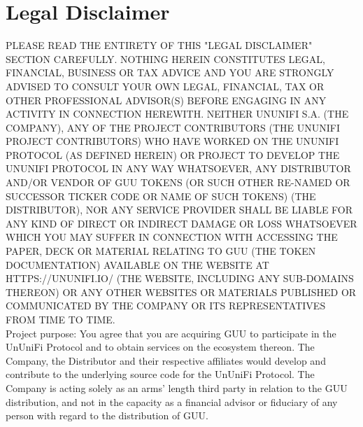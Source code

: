\documentclass[dvipdfmx]{jsarticle}
\begin{document}
\section{Legal Disclaimer}
PLEASE READ THE ENTIRETY OF THIS "LEGAL DISCLAIMER" SECTION CAREFULLY. NOTHING HEREIN CONSTITUTES LEGAL, FINANCIAL, BUSINESS OR TAX ADVICE AND YOU ARE STRONGLY ADVISED TO CONSULT YOUR OWN LEGAL, FINANCIAL, TAX OR OTHER PROFESSIONAL ADVISOR(S) BEFORE ENGAGING IN ANY ACTIVITY IN CONNECTION HEREWITH. NEITHER UNUNIFI S.A. (THE COMPANY), ANY OF THE PROJECT CONTRIBUTORS (THE UNUNIFI PROJECT CONTRIBUTORS) WHO HAVE WORKED ON THE UNUNIFI PROTOCOL (AS DEFINED HEREIN) OR PROJECT TO DEVELOP THE UNUNIFI PROTOCOL IN ANY WAY WHATSOEVER, ANY DISTRIBUTOR AND/OR VENDOR OF GUU TOKENS (OR SUCH OTHER RE-NAMED OR SUCCESSOR TICKER CODE OR NAME OF SUCH TOKENS) (THE DISTRIBUTOR), NOR ANY SERVICE PROVIDER SHALL BE LIABLE FOR ANY KIND OF DIRECT OR INDIRECT DAMAGE OR LOSS WHATSOEVER WHICH YOU MAY SUFFER IN CONNECTION WITH ACCESSING THE PAPER, DECK OR MATERIAL RELATING TO GUU (THE TOKEN DOCUMENTATION) AVAILABLE ON THE WEBSITE AT HTTPS://UNUNIFI.IO/ (THE WEBSITE, INCLUDING ANY SUB-DOMAINS THEREON) OR ANY OTHER WEBSITES OR MATERIALS PUBLISHED OR COMMUNICATED BY THE COMPANY OR ITS REPRESENTATIVES FROM TIME TO TIME.\\
Project purpose: You agree that you are acquiring GUU to participate in the UnUniFi Protocol and to obtain services on the ecosystem thereon. The Company, the Distributor and their respective affiliates would develop and contribute to the underlying source code for the UnUniFi Protocol. The Company is acting solely as an arms’ length third party in relation to the GUU distribution, and not in the capacity as a financial advisor or fiduciary of any person with regard to the distribution of GUU.\\
\end{document}
